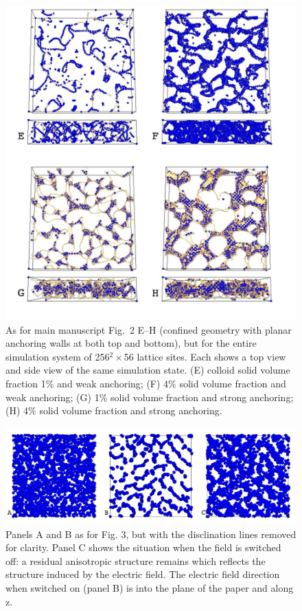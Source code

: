 \documentclass[12pt,twoside]{article}
\begin{document}
\begin{figure}[!h]
\begin{center}
\includegraphics[scale=0.42]{support-fig6.pdf}
\end{center}
\caption{As for main manuscript Fig.~2 E--H (confined geometry with planar
anchoring walls at both top and bottom), but for the entire simulation
system of 256$^2\times$56 lattice sites. Each shows a top view and
side view of the same simulation state. (E) colloid solid volume fraction 1\%
and weak anchoring; (F) 4\% solid volume fraction and weak anchoring;
(G) 1\% solid volume fraction and strong anchoring; (H) 4\% solid
volume fraction and strong anchoring.}
\end{figure}

\newpage


\begin{figure}[!h]
\begin{center}
\includegraphics[width=0.95\columnwidth]{support-fig7.pdf}
\end{center}
\caption{Panels A and B as for Fig. 3, but with the disclination lines
removed for clarity. Panel C shows the situation when the field is
switched off: a residual anisotropic structure remains which reflects the
structure induced by the electric field. The electric field direction
when switched on (panel B) is into the plane of the paper and along z.}
\end{figure}
\end{document}

